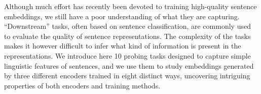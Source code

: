 Although much effort has recently been devoted to training high-quality sentence embeddings, we still have a poor understanding of what they are capturing. ``Downstream'' tasks, often based on sentence classification, are commonly used to evaluate the quality of sentence representations. The complexity of the tasks makes it however difficult to infer what kind of information is present in the representations. We introduce here 10 probing tasks designed to capture simple linguistic features of sentences, and we use them to study embeddings generated by three different encoders trained in eight distinct ways, uncovering intriguing properties of both encoders and  training methods.
